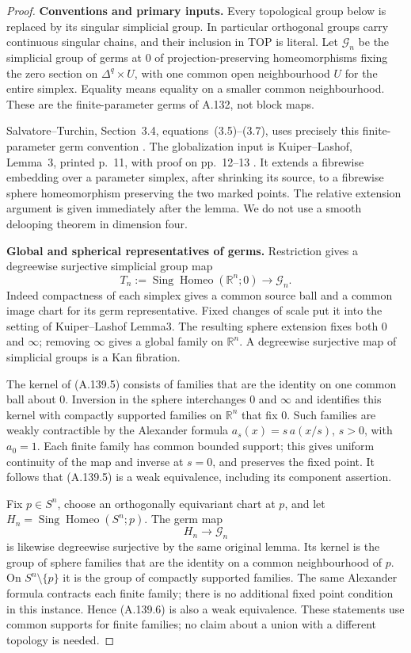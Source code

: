 \begin{proof}
\textbf{Conventions and primary inputs.}
Every topological group below is replaced by its singular simplicial
group. In particular orthogonal groups carry continuous singular
chains, and their inclusion in TOP is literal. Let $\mathcal G_n$
be the simplicial group of germs at $0$ of projection-preserving
homeomorphisms fixing the zero section on $\Delta^q\times U$, with one common open
neighbourhood $U$ for the entire simplex. Equality means equality
on a smaller common neighbourhood. These are the finite-parameter
germs of A.132, not block maps.

Salvatore--Turchin, Section~3.4, equations~(3.5)--(3.7),
uses precisely this finite-parameter germ convention
\cite{SalvatoreTurchin2026}. The globalization input is
Kuiper--Lashof, Lemma~3, printed p.~11, with proof on pp.~12--13
\cite{KuiperLashof1966I}. It extends a fibrewise embedding over a
parameter simplex, after shrinking its source, to a fibrewise sphere
homeomorphism preserving the two marked points. The relative
extension argument is given immediately after the lemma.
We do not use a smooth delooping theorem in dimension four.

\textbf{Global and spherical representatives of germs.}
Restriction gives a degreewise surjective simplicial group map
\[
 T_n:=\operatorname{Sing}\operatorname{Homeo}(\mathbb R^n;0)
        \longrightarrow\mathcal G_n.                  \tag{A.139.5}
\]
Indeed compactness of each simplex gives a common source ball and
a common image chart for its germ representative. Fixed changes of
scale put it into the setting of Kuiper--Lashof Lemma3. The resulting
sphere extension fixes both $0$ and $\infty$; removing $\infty$
gives a global family on $\mathbb R^n$. A degreewise surjective
map of simplicial groups is a Kan fibration.

The kernel of (A.139.5) consists of families that are the identity on
one common ball about $0$. Inversion in the sphere interchanges
$0$ and $\infty$ and identifies this kernel with compactly
supported families on $\mathbb R^n$ that fix $0$. Such families
are weakly contractible by the Alexander formula
$a_s(x)=s\,a(x/s)$, $s>0$, with $a_0=1$.
Each finite family has common bounded support; this gives uniform
continuity of the map and inverse at $s=0$, and preserves the fixed
point. It follows that (A.139.5) is a weak equivalence, including its
component assertion.

Fix $p\in S^n$, choose an orthogonally equivariant chart at $p$,
and let $H_n=\operatorname{Sing}\operatorname{Homeo}(S^n;p)$.
The germ map
\[
                        H_n\longrightarrow\mathcal G_n
                                                               \tag{A.139.6}
\]
is likewise degreewise surjective by the same original lemma.
Its kernel is the group of sphere families that are the identity
on a common neighbourhood of $p$. On $S^n\setminus\{p\}$ it is
the group of compactly supported families. The same Alexander
formula contracts each finite family; there is no additional fixed
point condition in this instance. Hence (A.139.6) is also a weak
equivalence. These statements use common supports for finite
families; no claim about a union with a different topology is needed.


\end{proof}
